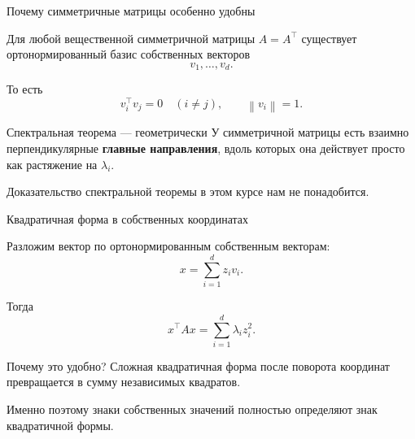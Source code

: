 \documentclass[aspectratio=169,10pt]{beamer}
\newcommand{\norm}[1]{\left\lVert #1\right\rVert}
\begin{document}
\begin{frame}{Почему симметричные матрицы особенно удобны}
\vspace{0.55em}

Для любой вещественной симметричной матрицы $A=A^\top$ существует ортонормированный базис собственных векторов
\[
  v_1,\ldots,v_d.
\]

То есть
\[
  v_i^\top v_j=0\quad(i\ne j),
  \qquad
  \norm{v_i}=1.
\]

\begin{block}{Спектральная теорема --- геометрически}
У симметричной матрицы есть взаимно перпендикулярные \textbf{главные направления}, вдоль которых она действует просто как растяжение на $\lambda_i$.
\end{block}

\small
Доказательство спектральной теоремы в этом курсе нам не понадобится.

\end{frame}

\begin{frame}{Квадратичная форма в собственных координатах}
\vspace{0.45em}

Разложим вектор по ортонормированным собственным векторам:
\[
  x=\sum_{i=1}^d z_i v_i.
\]

Тогда
\[
  \boxed{x^\top Ax=\sum_{i=1}^d \lambda_i z_i^2.}
\]

\begin{block}{Почему это удобно?}
Сложная квадратичная форма после поворота координат превращается в сумму независимых квадратов.
\end{block}

\small
Именно поэтому знаки собственных значений полностью определяют знак квадратичной формы.

\end{frame}
\end{document}

